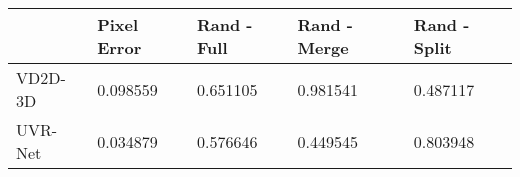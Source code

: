 \begin{tabular}{lllll}
\toprule
{} &  Pixel Error &  Rand - Full &  Rand - Merge &  Rand - Split \\
\midrule
VD2D-3D &     0.098559 &     0.651105 &      0.981541 &      0.487117 \\
UVR-Net &     0.034879 &     0.576646 &      0.449545 &      0.803948 \\
\bottomrule
\end{tabular}
